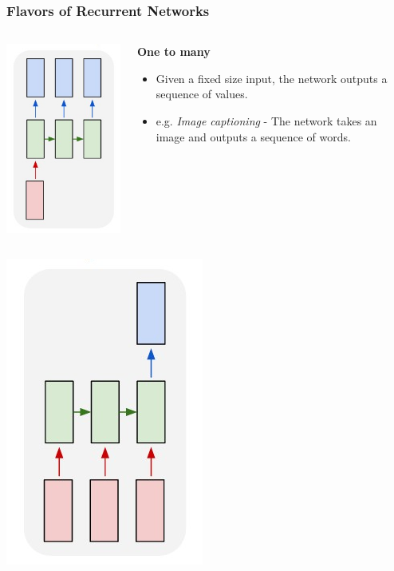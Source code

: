 \documentclass{beamer}
\begin{document}
\begin{frame}[allowframebreaks]
  \frametitle{Flavors of Recurrent Networks \cite{rnn-efectiveness}}
  \begin{columns}
    \begin{column}{0.3\textwidth}
      \begin{center}
        \includegraphics[height=0.7\textheight]{../img/rnn-one-to-many.png}
      \end{center}
    \end{column}
    \begin{column}{0.7\textwidth}
      \begin{center}
        \textbf{One to many}
      \end{center}
      \begin{itemize}
        \item Given a fixed size input, the network outputs a sequence of values.
        \item e.g. \textit{Image captioning} - The network takes an image and outputs a sequence of words.
      \end{itemize}
    \end{column}
  \end{columns}
  \framebreak
  \begin{columns}
    \begin{column}{0.3\textwidth}
      \includegraphics[height=0.7\textheight]{../img/rnn-many-to-one.png}

\end{column}
\end{columns}
\end{frame}
\end{document}
